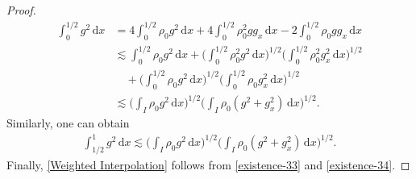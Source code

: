 \documentclass[11pt, reqno]{amsart}
\newcommand{\diff}{\mathrm{d}}
\numberwithin{equation}{section}
\begin{document}
{\begin{proof}
\begin{equation}
		\begin{aligned}
			\int_0^{1/2}g^2\,\diff x
			&=4\int_0^{1/2}\rho_0g^2\,\diff x+4\int_0^{1/2}\rho_0^2gg_x\,\diff x-2\int_0^{1/2}\rho_0gg_x\,\diff x\\
			&\lesssim \int_0^{1/2}\rho_0g^2\,\diff x+\bigg(\int_0^{1/2}\rho_0^2g^2\,\diff x\bigg)^{1/2}\bigg(\int_0^{1/2}\rho_0^2g_x^2\,\diff x\bigg)^{1/2}\\
			&\quad+\bigg(\int_0^{1/2}\rho_0g^2\,\diff x\bigg)^{1/2}\bigg(\int_0^{1/2}\rho_0g_x^2\,\diff x\bigg)^{1/2}\\
			&\lesssim \bigg(\int_I\rho_0g^2\,\diff x\bigg)^{1/2}\bigg(\int_I\rho_0(g^2+g_x^2)\,\diff x\bigg)^{1/2}.
		\end{aligned}
	\end{equation}
Similarly, one can obtain
	\begin{equation}\label{existence-34}
		\begin{aligned}
			\int_{1/2}^1g^2\,\diff x
			\lesssim \bigg(\int_I\rho_0g^2\,\diff x\bigg)^{1/2}\bigg(\int_I\rho_0(g^2+g_x^2)\,\diff x\bigg)^{1/2}.
		\end{aligned}
	\end{equation}
	Finally, \eqref{Weighted Interpolation} follows from \eqref{existence-33} and \eqref{existence-34}.
	
\end{proof}



}
\end{document}
